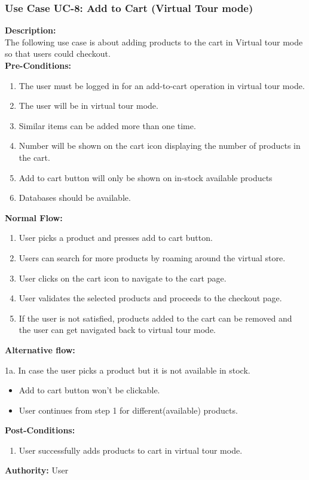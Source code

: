 \subsubsection{Use Case UC-8: Add to Cart (Virtual Tour mode) }
\textbf{Description:}\\
The following use case is about adding products to the cart in Virtual tour mode so that users could checkout. \\
\textbf{Pre-Conditions:}
\begin{enumerate}
    \item The user must be logged in for an add-to-cart operation in virtual tour mode.
\item The user will be in virtual tour mode.
 \item Similar items can be added more than one time. 
 \item Number will be shown on the cart icon displaying the number of products in the cart.
 \item Add to cart button will only be shown on in-stock available products
 \item Databases should be available. 
\end{enumerate}
\textbf{Normal Flow:}\\
\begin{enumerate}
\item User picks a product and presses add to cart button. 
\item Users can search for more products by roaming around the virtual store. 
\item User clicks on the cart icon to navigate to the cart page. 
\item User validates the selected products and proceeds to the checkout page. 
\item If the user is not satisfied, products added to the cart can be removed and the user can get navigated back to virtual tour mode. 
\end{enumerate}
\textbf{Alternative flow:}

1a. In case the user picks a product but it is not available in stock. 
\begin{itemize}
    \item 	Add to cart button won't be clickable.
     \item User continues from step 1 for different(available) products.
\end{itemize}
\textbf{Post-Conditions: }
\begin{enumerate}
\item	User successfully adds products to cart in virtual tour mode.
\end{enumerate}
\textbf{Authority:}
User
